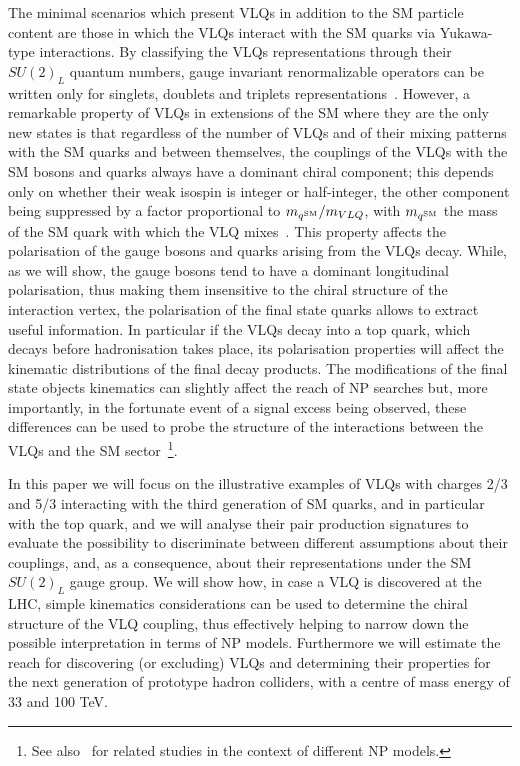 \documentclass[a4paper]{article}
\begin{document}
The minimal scenarios which present VLQs in addition to the SM particle content are those in which the VLQs interact with the SM quarks via Yukawa-type interactions. By classifying the VLQs representations through their $SU(2)_L$ quantum numbers, gauge invariant renormalizable operators can be written only for singlets, doublets and triplets representations~\cite{delAguila:2000rc,Okada:2012gy}. 
However, a remarkable property of VLQs in extensions of the SM where they are the only new states is that regardless of the number of VLQs and of their mixing patterns with the SM quarks and between themselves, the couplings of the VLQs with the SM bosons and quarks always have a dominant chiral component; this depends only on whether their weak isospin is integer or half-integer, the other component being suppressed by a factor proportional to $m_{q^{\rm SM}}/m_{VLQ}$, with $m_{q^{\rm SM}}$ the mass of the SM quark with which the VLQ mixes~\cite{delAguila:2000rc,Buchkremer:2013bha}. 
%
This property affects the polarisation of the gauge bosons and quarks arising from the VLQs decay. While, as we will show, the gauge bosons tend to have a dominant longitudinal polarisation, thus making them insensitive to the chiral structure of the interaction vertex, the polarisation of the final state quarks allows to extract useful information. 
%
In particular if the VLQs decay into a top quark, which decays before hadronisation takes place, its polarisation properties will affect the  kinematic distributions of the final decay products.
The modifications of the final state objects kinematics can slightly affect the reach of NP searches but, more importantly, in the fortunate event of a signal excess being observed, these differences can be used to probe the structure of the interactions between the VLQs and the SM sector~\footnote{See also~\cite{Godbole:2010kr,Belanger:2012tm} for related studies in the context of different NP models.}.

In this paper we will focus on the illustrative examples of VLQs with charges 2/3 and 5/3 interacting with the third generation of SM quarks, and in particular with the top quark, and we will analyse their pair production signatures to evaluate the possibility to discriminate between different assumptions about their couplings, and, as a consequence, about their representations under the SM $SU(2)_L$ gauge group. We will show how, in case a VLQ is discovered at the LHC, simple kinematics considerations can be used to determine the chiral structure of the VLQ coupling, thus effectively helping to narrow down the possible interpretation in terms of NP models. Furthermore we will estimate the reach for discovering (or excluding) VLQs and determining their properties for the next generation of prototype hadron colliders, with a centre of mass energy of 33 and 100 TeV.
\end{document}
